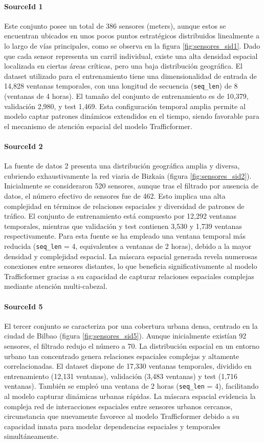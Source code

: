 \paragraph{SourceId 1} Este conjunto posee un total de 386 sensores (meters), aunque estos se encuentran ubicados en unos pocos puntos estratégicos distribuidos linealmente a lo largo de vías principales, como se observa en la figura \ref{fig:sensores_sid1}. Dado que cada sensor representa un carril individual, existe una alta densidad espacial localizada en ciertas áreas críticas, pero una baja distribución geográfica. El dataset utilizado para el entrenamiento tiene una dimensionalidad de entrada de 14,828 ventanas temporales, con una longitud de secuencia (\texttt{seq\_len}) de 8 (ventanas de 4 horas). El tamaño del conjunto de entrenamiento es de 10,379, validación 2,980, y test 1,469. Esta configuración temporal amplia permite al modelo captar patrones dinámicos extendidos en el tiempo, siendo favorable para el mecanismo de atención espacial del modelo Trafficformer.

\paragraph{SourceId 2} La fuente de datos 2 presenta una distribución geográfica amplia y diversa, cubriendo exhaustivamente la red viaria de Bizkaia (figura \ref{fig:sensores_sid2}). Inicialmente se consideraron 520 sensores, aunque tras el filtrado por ausencia de datos, el número efectivo de sensores fue de 462. Esto implica una alta complejidad en términos de relaciones espaciales y diversidad de patrones de tráfico. El conjunto de entrenamiento está compuesto por 12,292 ventanas temporales, mientras que validación y test contienen 3,530 y 1,739 ventanas respectivamente. Para esta fuente se ha empleado una ventana temporal más reducida (\texttt{seq\_len} = 4, equivalentes a ventanas de 2 horas), debido a la mayor densidad y complejidad espacial. La máscara espacial generada revela numerosas conexiones entre sensores distantes, lo que beneficia significativamente al modelo Trafficformer gracias a su capacidad de capturar relaciones espaciales complejas mediante atención multi-cabezal.

\paragraph{SourceId 5} El tercer conjunto se caracteriza por una cobertura urbana densa, centrado en la ciudad de Bilbao (figura \ref{fig:sensores_sid5}). Aunque inicialmente existían 92 sensores, el filtrado redujo el número a 70. La distribución espacial en un entorno urbano tan concentrado genera relaciones espaciales complejas y altamente correlacionadas. El dataset dispone de 17,330 ventanas temporales, dividido en entrenamiento (12,131 ventanas), validación (3,483 ventanas) y test (1,716 ventanas). También se empleó una ventana de 2 horas (\texttt{seq\_len} = 4), facilitando al modelo capturar dinámicas urbanas rápidas. La máscara espacial evidencia la compleja red de interacciones espaciales entre sensores urbanos cercanos, circunstancia que nuevamente favorece al modelo Trafficformer debido a su capacidad innata para modelar dependencias espaciales y temporales simultáneamente.

